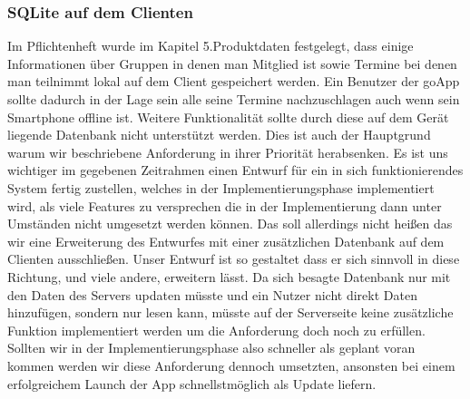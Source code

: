 	\subsubsection{SQLite auf dem Clienten}
	Im Pflichtenheft wurde im Kapitel 5.Produktdaten festgelegt, dass einige Informationen über Gruppen in denen man Mitglied ist sowie Termine bei denen man teilnimmt lokal auf dem Client gespeichert werden. Ein Benutzer der goApp sollte dadurch in der Lage sein alle seine Termine nachzuschlagen auch wenn sein Smartphone offline ist. Weitere Funktionalität sollte durch diese auf dem Gerät liegende Datenbank nicht unterstützt werden.
	\newline Dies ist auch der Hauptgrund warum wir beschriebene Anforderung in ihrer Priorität herabsenken. Es ist uns wichtiger im gegebenen Zeitrahmen einen Entwurf für ein in sich funktionierendes System fertig zustellen, welches in der Implementierungsphase implementiert wird, als viele Features zu versprechen die in der Implementierung dann unter Umständen nicht umgesetzt werden können.
	\newline Das soll allerdings nicht heißen das wir eine Erweiterung des Entwurfes mit einer zusätzlichen Datenbank auf dem Clienten ausschließen. Unser Entwurf ist so gestaltet dass er sich sinnvoll in diese Richtung, und viele andere, erweitern lässt.
	Da sich besagte Datenbank nur mit den Daten des Servers updaten müsste und ein Nutzer nicht direkt Daten hinzufügen, sondern nur lesen kann, müsste auf der Serverseite keine zusätzliche Funktion implementiert werden um die Anforderung doch noch zu erfüllen.
	\newline Sollten wir in der Implementierungsphase also schneller als geplant voran kommen werden wir diese Anforderung dennoch umsetzten, ansonsten bei einem erfolgreichem Launch der App schnellstmöglich als Update liefern.  
	\newpage